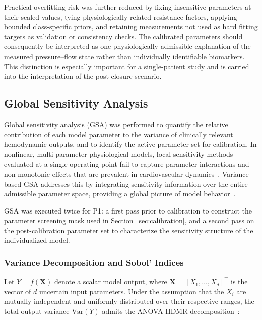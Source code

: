 \documentclass{article}
\begin{document}
Practical overfitting risk was further reduced by fixing insensitive parameters at their scaled values, tying physiologically related resistance factors, applying bounded class-specific priors, and retaining measurements not used as hard fitting targets as validation or consistency checks. The calibrated parameters should consequently be interpreted as one physiologically admissible explanation of the measured pressure--flow state rather than individually identifiable biomarkers. This distinction is especially important for a single-patient study and is carried into the interpretation of the post-closure scenario.


\subsection{Global Sensitivity Analysis}
\label{sec:gsa}

Global sensitivity analysis (GSA) was performed to quantify the
relative contribution of each model parameter to the variance of
clinically relevant hemodynamic outputs, and to identify the
active parameter set for calibration. In nonlinear, multi-parameter
physiological models, local sensitivity methods evaluated at a single
operating point fail to capture parameter interactions and
non-monotonic effects that are prevalent in cardiovascular
dynamics~\cite{Saltelli2010}. Variance-based GSA
addresses this by integrating sensitivity information over the entire
admissible parameter space, providing a global picture of model
behavior~\cite{Saltelli2010}.

GSA was executed twice for P1: a first pass prior to calibration
to construct the parameter screening mask used in
Section~\ref{sec:calibration}, and a second pass on the
post-calibration parameter set to characterize the sensitivity
structure of the individualized model.

\subsubsection{Variance Decomposition and Sobol' Indices}
\label{sec:sobol_theory}

Let $Y = f(\mathbf{X})$ denote a scalar model output, where
$\mathbf{X} = [X_1, \ldots, X_d]^\top$ is the vector of $d$
uncertain input parameters. Under the assumption that the $X_i$
are mutually independent and uniformly distributed over their
respective ranges, the total output variance $\mathrm{Var}(Y)$
admits the ANOVA-HDMR decomposition~\cite{Saltelli2010}:
\end{document}
